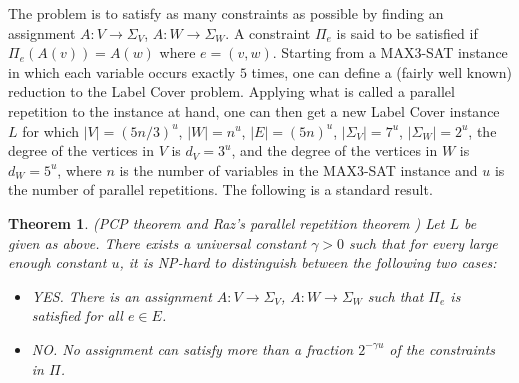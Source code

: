 \documentclass[11pt]{article}
\newtheorem{thm}{Theorem}[section]
\begin{document}
The problem is to satisfy as many constraints
as possible by finding an assignment $A\colon V \rightarrow \Sigma_V$,
$A\colon W \rightarrow \Sigma_W$. A constraint $\Pi_e$ is said
to be satisfied if $\Pi_e(A(v))=A(w)$ where $e=(v,w)$.
Starting from a MAX3-SAT instance
in which each variable occurs exactly $5$ times, one can define
a (fairly well known) reduction to the Label Cover problem.
Applying what is called a parallel repetition to the instance
at hand, one can then get a new Label Cover instance $L$
for which $|V|=(5n/3)^u$, $|W| = n^u$, $|E|=(5n)^u$,
$|\Sigma_V|=7^u$, $|\Sigma_W|=2^u$, the degree of the vertices
in $V$ is $d_V=3^u$, and the degree of the vertices in $W$ is
$d_W=5^u$, where $n$ is the number of variables in the MAX3-SAT
instance and $u$ is the number of parallel repetitions. The
following is a standard result.

\begin{thm} (PCP theorem \cite{Pcp,Pcp2} and Raz's parallel repetition theorem \cite{Raz})
\label{Raz} Let $L$ be given as above. There exists a universal
constant $\gamma > 0$ such that for every large enough constant
$u$, it is \textsf{NP}-hard to distinguish between the following two cases:

\begin{itemize}
\item YES. There is an assignment $A\colon V \rightarrow \Sigma_V$,
$A\colon W \rightarrow \Sigma_W$ such that $\Pi_e$ is satisfied for
all $e \in E$.

\item NO. No assignment can satisfy more than a fraction
$2^{-\gamma u}$ of the constraints in $\Pi$.
\end{itemize}
\end{thm}
\end{document}
